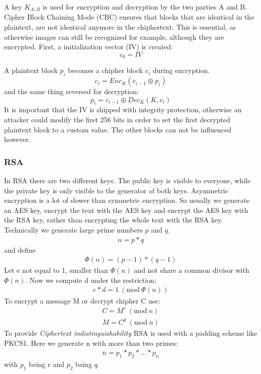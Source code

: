\documentclass{scrartcl}
\begin{document}
A key $K_{A,B}$ is used for encryption and decryption by the two parties A and B. 
Cipher Block Chaining Mode (CBC) ensures that blocks that are identical in the plaintext, are not identical anymore in the chiphertext. This is essential, as otherwise images can still be recognized for example, although they are encrypted. First, a initialization vector (IV) is created:
$$
c_0 = IV
$$

A plaintext block $p_i$ becomes a chipher block $c_i$ during encryption.
$$
c_i = Enc_K(c_{i-1} \oplus p_i)
$$
and the same thing reversed for decryption:
$$
p_i = c_{i-1} \oplus Dec_K(K, c_i)
$$
It is important that the IV is shipped with integrity protection, otherwise an attacker could modify the first 256 bits in order to set the first decrypted plaintext block to a custom value. The other blocks can not be influenced however.

\subsubsection{RSA}
In RSA there are two different keys. The public key is visible to everyone, while the private key is only visible to the generator of both keys.  Asymmetric encryption is a lot of slower than symmetric encryption. So usually we generate an AES key, encrypt the text with the AES key and encrypt the AES key with the RSA key, rather than encrypting the whole text with the RSA key.
 Technically we generate large prime numbers $p$ and $q$.
\begin{eqnarray*}
 n = p *q 
\end{eqnarray*}
 and define
\begin{eqnarray*}
 \Phi(n) = (p-1)*(q-1)
\end{eqnarray*}
 Let e not equal to 1, smaller than $ \Phi(n)$ and not share a common divisor with $ \Phi(n)$.
 Now we compute d under the restriction:
 \newcommand{\Mod}[1]{\ (\text{mod}\ #1)}
\begin{eqnarray*}
 e*d = 1 \Mod{\Phi(n)}
\end{eqnarray*}
 To encrypt a message M or decrypt chipher C use:
\begin{eqnarray*}
 C = M^e \Mod{n}\\
 M = C^d \Mod{n}
\end{eqnarray*}
 To provide \textit{Ciphertext indistinguishability} RSA is used with a padding scheme like PKCS1. Here we generate n with more than two primes:
 \begin{eqnarray*}
 n = p_1*p_2*...*p_n
\end{eqnarray*}
with $p_1$ being r and $p_2$ being $q$.
\end{document}
